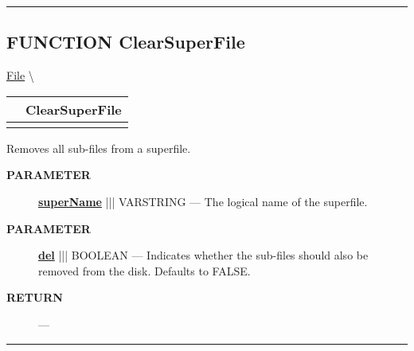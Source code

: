 \rule{\linewidth}{0.5pt}
\subsection*{\textsf{\colorbox{headtoc}{\color{white} FUNCTION}
ClearSuperFile}}

\hypertarget{ecldoc:file.clearsuperfile}{}
\hspace{0pt} \hyperlink{ecldoc:File}{File} \textbackslash 

{\renewcommand{\arraystretch}{1.5}
\begin{tabularx}{\textwidth}{|>{\raggedright\arraybackslash}l|X|}
\hline
\hspace{0pt}\mytexttt{\color{red} } & \textbf{ClearSuperFile} \\
\hline
\multicolumn{2}{|>{\raggedright\arraybackslash}X|}{\hspace{0pt}\mytexttt{\color{param} (varstring superName, boolean del=FALSE)}} \\
\hline
\end{tabularx}
}

\par





Removes all sub-files from a superfile.






\par
\begin{description}
\item [\colorbox{tagtype}{\color{white} \textbf{\textsf{PARAMETER}}}] \textbf{\underline{superName}} ||| VARSTRING --- The logical name of the superfile.
\item [\colorbox{tagtype}{\color{white} \textbf{\textsf{PARAMETER}}}] \textbf{\underline{del}} ||| BOOLEAN --- Indicates whether the sub-files should also be removed from the disk. Defaults to FALSE.
\end{description}







\par
\begin{description}
\item [\colorbox{tagtype}{\color{white} \textbf{\textsf{RETURN}}}] \textbf{} --- 
\end{description}




\rule{\linewidth}{0.5pt}
